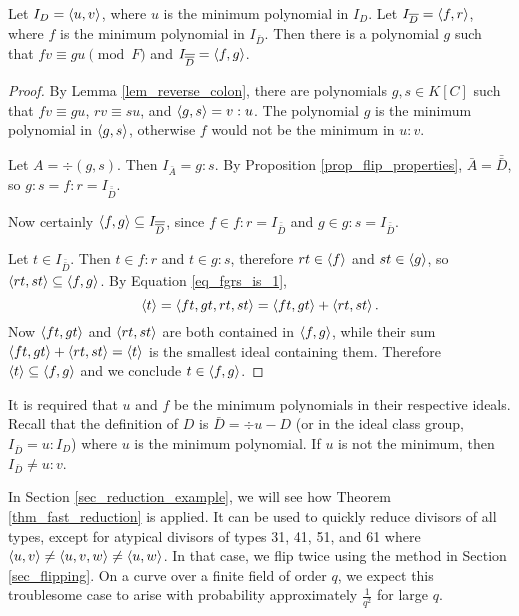 \begin{theorem}
  \label{thm_fast_reduction}
  Let $I_D = \left\langle u,v \right\rangle$, where $u$ is the minimum polynomial in $I_D$.
  Let $I_{\overline D} = \left\langle f, r \right\rangle$, where $f$ is the minimum polynomial in $I_{\bar D}$.
  Then there is a polynomial $g$ such that $fv \equiv gu \pmod F$ and $I_{\overline{\overline D}} = \left\langle f,g \right\rangle$.
\end{theorem}
\begin{proof}
  By Lemma \ref{lem_reverse_colon},
  there are polynomials $g, s \in K[C]$ such that $fv \equiv gu$, $rv \equiv su$, and $\left\langle g,s \right\rangle = v : u$.
  The polynomial $g$ is the minimum polynomial in $\left\langle g,s \right\rangle$,
  otherwise $f$ would not be the minimum in $u : v$.
  
  Let $A = \div(g,s)$.
  Then $I_{\bar A} = g : s$.
  By Proposition \ref{prop_flip_properties}, $\bar A = \bar{\bar D}$,
  so $g : s = f : r = I_{\bar{\bar D}}$.
  
  Now certainly $\left\langle f,g \right\rangle \subseteq I_{\overline{\overline D}}$,
  since $f \in f : r = I_{\bar{\bar D}}$ and $g \in g : s = I_{\bar{\bar D}}$.
  
  Let $t \in I_{\bar{\bar D}}$.
  Then $t \in f : r$ and $t \in g : s$, therefore $rt \in \left\langle f \right\rangle$ and $st \in \left\langle g \right\rangle$,
  so $\left\langle rt, st \right\rangle \subseteq \left\langle f,g \right\rangle$.
  By Equation \ref{eq_fgrs_is_1},
  \[ \left\langle t \right\rangle = \left\langle ft,gt,rt,st \right\rangle = \left\langle ft,gt \right\rangle + \left\langle rt,st \right\rangle. \]
  Now $\left\langle ft,gt \right\rangle$ and $\left\langle rt,st \right\rangle$ are both contained in $\left\langle f, g \right\rangle$,
  while their sum $\left\langle ft,gt \right\rangle + \left\langle rt,st \right\rangle = \left\langle t \right\rangle$ is the smallest ideal containing them.
  Therefore $\left\langle t \right\rangle \subseteq \left\langle f,g \right\rangle$ and we conclude $t \in \left\langle f,g \right\rangle$.
\end{proof}
\begin{remark}
  It is required that $u$ and $f$ be the minimum polynomials in their respective ideals.
  Recall that the definition of $D$ is $\bar D = \div u - D$
  (or in the ideal class group, $I_{\bar D} = u : I_D$)
  where $u$ is the minimum polynomial.
  If $u$ is not the minimum, then $I_{\bar D} \neq u : v$.
\end{remark}

In Section \ref{sec_reduction_example}, we will see how Theorem \ref{thm_fast_reduction} is applied.
It can be used to quickly reduce divisors of all types, except for atypical divisors of types 31, 41, 51, and 61
where $\left\langle u,v \right\rangle \neq \left\langle u,v,w \right\rangle \neq \left\langle u,w \right\rangle$.
In that case, we flip twice using the method in Section \ref{sec_flipping}.
On a curve over a finite field of order $q$,
we expect this troublesome case to arise with probability approximately $\frac 1 {q^2}$ for large $q$.



